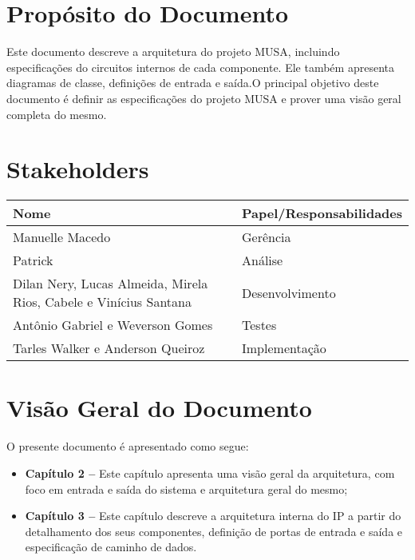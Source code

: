   \section{Propósito do Documento}
  Este documento descreve a arquitetura do projeto MUSA, incluindo especificações do circuitos internos de cada componente. Ele também apresenta diagramas de classe, definições de entrada e saída.O principal objetivo deste documento é definir as especificações do projeto MUSA e prover uma visão geral completa do mesmo.

  \section{Stakeholders}
    \FloatBarrier
    \begin{table}[H] 
      \begin{center}
        \begin{tabular}[pos]{|m{6cm} | m{8cm}|} 
          \hline 
          \cellcolor[gray]{0.9}\textbf{Nome} & \cellcolor[gray]{0.9}\textbf{Papel/Responsabilidades} \\  
           \hline Manuelle Macedo 	& Gerência \\
           \hline Patrick 	& Análise \\
           \hline Dilan Nery, Lucas Almeida, Mirela Rios, Cabele e Vinícius Santana	& Desenvolvimento \\
           \hline Antônio Gabriel e Weverson Gomes	& Testes       \\
           \hline Tarles Walker e Anderson Queiroz 	& Implementação \\ \hline
        \end{tabular}
      \end{center}
    \end{table} 

\section{Visão Geral do Documento}

O presente documento é apresentado como segue:

  \begin{itemize}
   \item \textbf{Capítulo 2 --} Este capítulo apresenta uma visão geral da arquitetura, com foco em entrada e saída do sistema e arquitetura geral do mesmo;
   \item \textbf{Capítulo 3 --} Este capítulo descreve a arquitetura interna do IP a partir do detalhamento dos seus componentes, definição de portas de entrada e saída e especificação de caminho de dados.
  \end{itemize}


